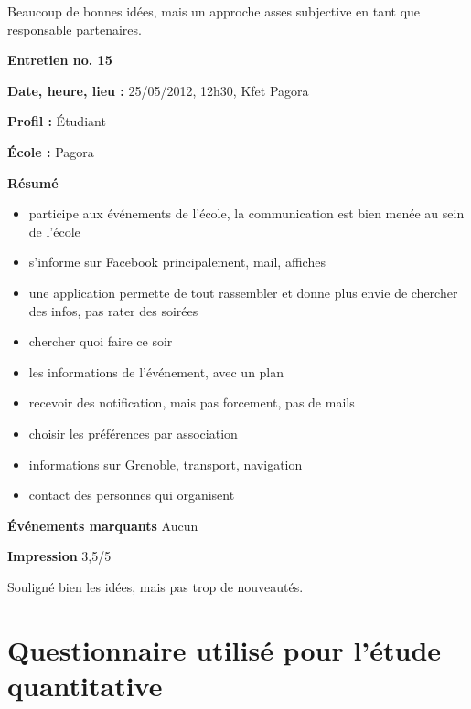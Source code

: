 \documentclass[a4paper, 11px]{article}
\begin{document}
Beaucoup de bonnes idées, mais un approche asses subjective en tant que responsable partenaires.



\vspace{.3cm}

 \textbf {\large Entretien no. 15}

\textbf{Date, heure, lieu : }
25/05/2012, 12h30, Kfet Pagora

\textbf{Profil : }
Étudiant 

\textbf{École : }
Pagora

\textbf{Résumé}
	\begin{itemize}
		\item participe aux événements de l'école, la communication est bien menée au sein de l'école 
		\item s'informe sur Facebook principalement, mail, affiches
		\item une application permette de tout rassembler et donne plus envie de chercher des infos, pas rater des soirées
		\item chercher quoi faire ce soir
		\item les informations de l'événement, avec un plan 
		\item recevoir des notification, mais pas forcement, pas de mails
		\item choisir les préférences par association
		\item informations sur Grenoble, transport, navigation
		\item contact des personnes qui organisent
	\end{itemize}

\textbf{Événements marquants}
Aucun

\textbf{Impression}
3,5/5

Souligné bien les idées, mais pas trop de nouveautés.
\newpage

\section{Questionnaire utilisé pour l'étude quantitative}
\end{document}
